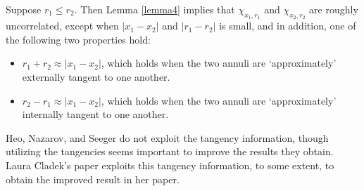 \begin{remark}
    Suppose $r_1 \leq r_2$. Then Lemma \ref{lemma4} implies that $\chi_{x_1,r_1}$ and $\chi_{x_2,r_2}$ are roughly uncorrelated, except when $|x_1 - x_2|$ and $|r_1 - r_2|$ is small, and in addition, one of the following two properties hold:
    \begin{itemize}
        \item $r_1 + r_2 \approx |x_1 - x_2|$, which holds when the two annuli are `approximately' externally tangent to one another.

        \item $r_2 - r_1 \approx |x_1 - x_2|$, which holds when the two annuli are `approximately' internally tangent to one another.
    \end{itemize}
    Heo, Nazarov, and Seeger do not exploit the tangency information, though utilizing the tangencies seems important to improve the results they obtain. Laura Cladek's paper exploits this tangency information, to some extent, to obtain the improved result in her paper.
\end{remark}

